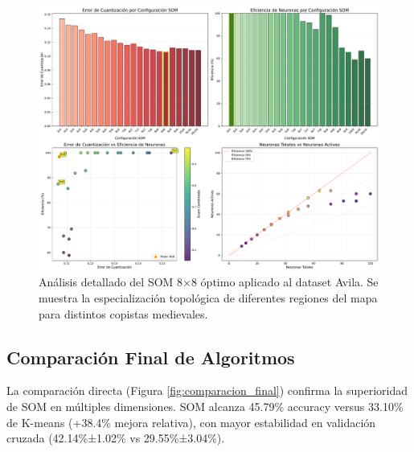 \documentclass[12pt,a4paper]{article}
\begin{document}
\begin{figure}[H]
    \centering
    \includegraphics[width=\textwidth]{figures/figura_11_resultados_som_detallados_avila.pdf}
    \caption{Análisis detallado del SOM 8×8 óptimo aplicado al dataset Avila. Se muestra la especialización topológica de diferentes regiones del mapa para distintos copistas medievales.}
    \label{fig:som_detallado_avila}
\end{figure}

\subsection{Comparación Final de Algoritmos}

La comparación directa (Figura \ref{fig:comparacion_final}) confirma la superioridad de SOM en múltiples dimensiones. SOM alcanza 45.79\% accuracy versus 33.10\% de K-means (+38.4\% mejora relativa), con mayor estabilidad en validación cruzada (42.14\%±1.02\% vs 29.55\%±3.04\%).
\end{document}
